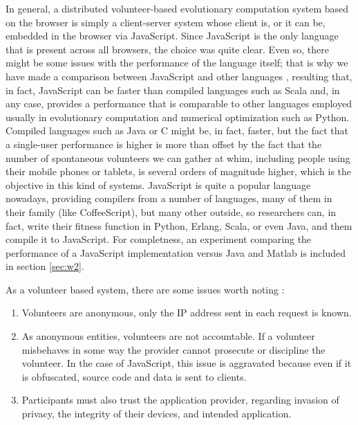 \documentclass[journal,onecolumn]{IEEEtran}
\begin{document}
In general, a distributed volunteer-based evolutionary computation
system based on the browser is simply a client-server system
whose client is, or it can be, embedded in the browser via
JavaScript. Since JavaScript is  the only language that is present
across all browsers, the choice was quite clear. Even so, there might
be some issues with the performance of the language itself; that %
 is
why we have made a comparison between JavaScript and other languages
\cite{2015arXiv151101088M}, resulting that, in fact, JavaScript can be
faster than compiled languages such as Scala and, in any case, provides
a performance that is comparable to other languages employed usually %
in evolutionary computation and numerical optimization such as Python. 
Compiled languages such as
Java or C might be, in fact, faster, but the fact %
 that a single-user
performance is higher is more than offset by the fact that the number
of spontaneous volunteers we can gather at whim, including people
using their mobile phones or tablets, is several orders of magnitude
higher, which is the objective in this kind of systems.
 JavaScript is
quite a popular language nowadays, providing compilers from a number
of languages, many of them in their family (like CoffeeScript), but
many other outside, so researchers can, in fact, write their fitness
function in Python, Erlang, Scala, or even Java, and them compile it to
JavaScript. For completness, an experiment comparing the performance of
a JavaScript implementation versus Java and Matlab is included in section
\ref{sec:w2}.

As a volunteer based system, there are some issues worth 
noting \cite{sarmenta2001volunteer,web:BOINC} :\begin{enumerate}
\item Volunteers are anonymous, only the IP address sent in 
each request is known.
\item As anonymous entities, volunteers are not accountable. 
If a volunteer misbehaves in some way the provider cannot 
prosecute or discipline the volunteer. In the case of JavaScript,
this issue is aggravated because even if it is obfuscated, source code
and data is sent to clients. 
\item Participants must also trust the application provider, 
regarding invasion of privacy, the integrity of their devices, 
and intended application. 
\end{enumerate}
\end{document}
